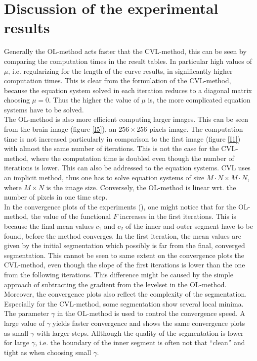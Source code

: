 \section{Discussion of the experimental results}
Generally the OL-method acts faster that the CVL-method, this can be seen by comparing the computation times in the result tables. In particular high values of $\mu$, i.e. regularizing for the length of the curve results, in significantly higher computation times. This is clear from the formulation of the CVL-method, because the equation system solved in each iteration reduces to a diagonal matrix choosing $\mu=0$. Thus the higher the value of $\mu$ is, the more complicated equation systems have to be solved.\\
The OL-method is also more efficient computing larger images. This can be seen from the brain image (figure \ref{I5}), an $256\times 256$ pixels image. The computation time is not increased particularly in comparison to the first image (figure \ref{I1}) with almost the same number of iterations. This is not the case for the CVL-method, where the computation time is doubled even though the number of iterations is lower. This can also be addressed to the equation systems. CVL uses an implicit method, thus one has to solve equation systems of size $M\cdot N\times M\cdot N$, where $M\times N$ is the image size. Conversely, the OL-method is linear wrt. the number of pixels in one time step.\\
In the convergence plots of the experiments (), one might notice that for the OL-method, the value of the functional $F$ increases in the first iterations. This is because the final mean values $c_1$ and $c_2$ of the inner and outer segment have to be found, before the method converges. In the first iteration, the mean values are given by the initial segmentation which possibly is far from the final, converged segmentation. This cannot be seen to same extent on the convergence plots the CVL-method, even though the slope of the first iterations is lower than the one from the following iterations. This difference might be caused by the simple approach of subtracting the gradient from the levelset in the OL-method. Moreover, the convergence plots also reflect the complexity of the segmentation. Especially for the CVL-method, some segmentation show several local minima.\\
The parameter $\gamma$ in the OL-method is used to control the convergence speed. A large value of $\gamma$ yields faster convergence and shows the same convergence plots as small $\gamma$ with larger steps. Allthough the quality of the segmentation is lower for large $\gamma$, i.e. the boundary of the inner segment is often not that ``clean'' and tight as when choosing small $\gamma$.\\ 
